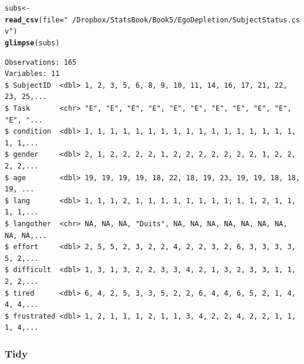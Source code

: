 \documentclass{article}\usepackage[]{graphicx}\usepackage[]{color}
\makeatletter
\newcommand{\hlstr}[1]{\textcolor[rgb]{0.192,0.494,0.8}{#1}}%
\newcommand{\hlstd}[1]{\textcolor[rgb]{0.345,0.345,0.345}{#1}}%
\newcommand{\hlkwb}[1]{\textcolor[rgb]{0.69,0.353,0.396}{#1}}%
\newcommand{\hlkwc}[1]{\textcolor[rgb]{0.333,0.667,0.333}{#1}}%
\newcommand{\hlkwd}[1]{\textcolor[rgb]{0.737,0.353,0.396}{\textbf{#1}}}%
\newenvironment{kframe}{%
 \def\at@end@of@kframe{}%
 \ifinner\ifhmode%
  \def\at@end@of@kframe{\end{minipage}}%
  \begin{minipage}{\columnwidth}%
 \fi\fi%
 \def\FrameCommand##1{\hskip\@totalleftmargin \hskip-\fboxsep
 \colorbox{shadecolor}{##1}\hskip-\fboxsep
     \hskip-\linewidth \hskip-\@totalleftmargin \hskip\columnwidth}%
 \MakeFramed {\advance\hsize-\width
   \@totalleftmargin\z@ \linewidth\hsize
   \@setminipage}}%
 {\par\unskip\endMakeFramed%
 \at@end@of@kframe}
\newenvironment{knitrout}{}{} %
\makeatother
\begin{document}
\begin{knitrout}\footnotesize
{}\color{fgcolor}\begin{kframe}
\begin{alltt}
\hlstd{subs} \hlkwb{<-} \hlkwd{read_csv}\hlstd{(}\hlkwc{file} \hlstd{=} \hlstr{"~/Dropbox/StatsBook/Book5/EgoDepletion/SubjectStatus.csv"}\hlstd{)}
\hlkwd{glimpse}\hlstd{(subs)}
\end{alltt}
\begin{verbatim}
Observations: 165
Variables: 11
$ SubjectID  <dbl> 1, 2, 3, 5, 6, 8, 9, 10, 11, 14, 16, 17, 21, 22, 23, 25,...
$ Task       <chr> "E", "E", "E", "E", "E", "E", "E", "E", "E", "E", "E", "...
$ condition  <dbl> 1, 1, 1, 1, 1, 1, 1, 1, 1, 1, 1, 1, 1, 1, 1, 1, 1, 1, 1,...
$ gender     <dbl> 2, 1, 2, 2, 2, 2, 1, 2, 2, 2, 2, 2, 2, 2, 1, 2, 2, 2, 2,...
$ age        <dbl> 19, 19, 19, 19, 18, 22, 18, 19, 23, 19, 19, 18, 18, 19, ...
$ lang       <dbl> 1, 1, 1, 2, 1, 1, 1, 1, 1, 1, 1, 1, 1, 1, 2, 1, 1, 1, 1,...
$ langother  <chr> NA, NA, NA, "Duits", NA, NA, NA, NA, NA, NA, NA, NA, NA,...
$ effort     <dbl> 2, 5, 5, 2, 3, 2, 2, 4, 2, 2, 3, 2, 6, 3, 3, 3, 3, 5, 2,...
$ difficult  <dbl> 1, 3, 1, 3, 2, 2, 3, 3, 4, 2, 1, 3, 2, 3, 3, 1, 1, 2, 2,...
$ tired      <dbl> 6, 4, 2, 5, 3, 3, 5, 2, 2, 6, 4, 4, 6, 5, 2, 1, 4, 4, 4,...
$ frustrated <dbl> 1, 2, 1, 1, 1, 2, 1, 1, 3, 4, 2, 2, 4, 2, 2, 1, 1, 1, 4,...
\end{verbatim}
\end{kframe}
\end{knitrout}

\subsubsection{Tidy}
\end{document}
